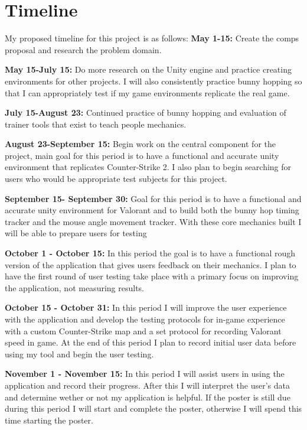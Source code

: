 \documentclass[10pt,twocolumn]{article}
\begin{document}
\section{Timeline}

My proposed timeline for this project is as follows:
\textbf{May 1-15:}
Create the comps proposal and research the problem domain.

\textbf{May 15-July 15:}
Do more research on the Unity engine and practice creating environments for other projects. I will also consistently practice bunny hopping so that I can appropriately test if my game environments replicate the real game.

\textbf{July 15-August 23:}
Continued practice of bunny hopping and evaluation of trainer tools that exist to teach people mechanics.

\textbf{August 23-September 15:}
Begin work on the central component for the project, main goal for this period is to have a functional and accurate unity environment that replicates Counter-Strike 2. I also plan to begin searching for users who would be appropriate test subjects for this project.

\textbf{September 15- September 30:}
Goal for this period is to have a functional and accurate unity environment for Valorant and to build both the bunny hop timing tracker and the mouse angle movement tracker. With these core mechanics built I will be able to prepare users for testing

\textbf{October 1 - October 15:}
In this period the goal is to have a functional rough version of the application that gives users feedback on their mechanics. I plan to have the first round of user testing take place with a primary focus on improving the application, not measuring results.

\textbf{October 15 - October 31:}
In this period I will improve the user experience with the application and develop the testing protocols for in-game experience with a custom Counter-Strike map and a set protocol for recording Valorant speed in game. At the end of this period I plan to record initial user data before using my tool and begin the user testing.

\textbf{November 1 - November 15:}
In this period I will assist users in using the application and record their progress. After this I will interpret the user's data and determine wether or not my application is helpful. If the poster is still due during this period I will start and complete the poster, otherwise I will spend this time starting the poster.
\end{document}
